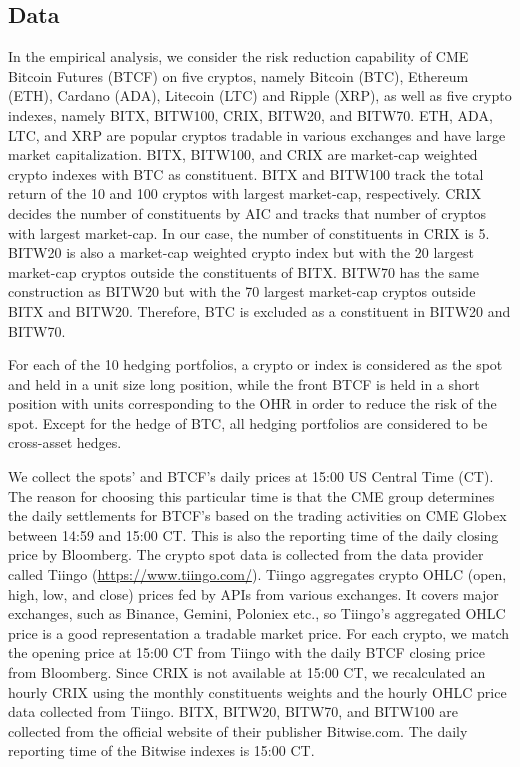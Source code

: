 \subsection{Data}\label{subsec:data}
In the empirical analysis, we consider the risk reduction capability
of CME Bitcoin Futures (BTCF) on five cryptos, namely Bitcoin (BTC), Ethereum
(ETH), Cardano (ADA), Litecoin (LTC) and Ripple (XRP), as well as five
crypto indexes, namely BITX, BITW100, CRIX, BITW20, and BITW70.
ETH, ADA, LTC, and XRP are popular cryptos tradable in various
exchanges and have large market capitalization. 
BITX, BITW100, and CRIX are market-cap weighted crypto indexes with
BTC as constituent. 
BITX and BITW100 track the total return of the 10 and 100 cryptos
with largest market-cap, respectively. 
CRIX decides the number of constituents by AIC and tracks that number
of cryptos with largest market-cap. In our case, the number of
constituents in CRIX is 5. 
BITW20 is also a market-cap weighted crypto index but with the 20
largest market-cap cryptos outside the constituents of BITX.
BITW70 has the same construction as BITW20 but with the 70 largest
market-cap cryptos outside BITX and BITW20. 
Therefore, BTC is excluded as a constituent in BITW20 and BITW70.

For each of the 10 hedging portfolios, a crypto or index is considered
as the spot and held in a unit size long position, while 
the front BTCF is held in a short position with units corresponding to
the OHR in order to reduce the risk of the spot. 
Except for the hedge of BTC, all hedging portfolios are considered to
be cross-asset hedges. 

We collect the spots' and BTCF's daily prices at 15:00 US Central Time
(CT). The reason for choosing this particular time is that the CME
group determines the daily settlements for BTCF's based on the trading
activities on CME Globex between 14:59 and 15:00 CT. This is also the
reporting time of the daily closing price by Bloomberg. 
The crypto spot data is collected from the data provider called
Tiingo (\href{https://www.tiingo.com/}{https://www.tiingo.com/}).
Tiingo aggregates crypto OHLC (open, high, low, and close) prices fed
by APIs from various exchanges. It covers major exchanges, such as
Binance, Gemini, Poloniex etc., so Tiingo's aggregated OHLC price is a
good representation a tradable market price. 
For each crypto, we match the opening price at 15:00 CT from Tiingo
with the daily BTCF closing price from Bloomberg.
Since CRIX is not available at 15:00 CT, we recalculated an hourly
CRIX using the monthly constituents weights and the hourly OHLC price
data collected from Tiingo. 
BITX, BITW20, BITW70, and BITW100 are collected from the official
website of their publisher Bitwise.com. 
The daily reporting time of the Bitwise indexes is 15:00 CT.

